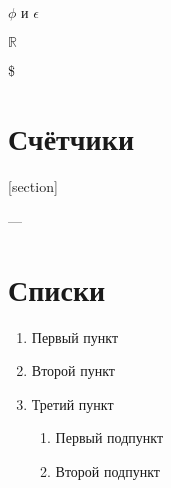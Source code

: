 \documentclass[12pt, a4paper]{article}
\theoremstyle{plain}              %
\theoremstyle{definition}         %
\begin{document}
$ \phi $ и $ \epsilon $


\renewcommand{\epsilon}{\ensuremath{\mathbb{R}}}

\epsilon

\$


\section{Счётчики}


[section]

\setcounter{jtem}{13}











\thesection --- \thepage

\renewcommand{\thepage}{\roman{page}}

\renewcommand{\thesection}{\Asbuk{section}}
\setcounter{section}{0}






\section{Списки}

\begin{enumerate}
\item Первый пункт
\item Второй пункт
\item Третий пункт
\begin{enumerate}
\item Первый подпункт
\item Второй подпункт
\end{enumerate}
\end{enumerate}
\end{document}
